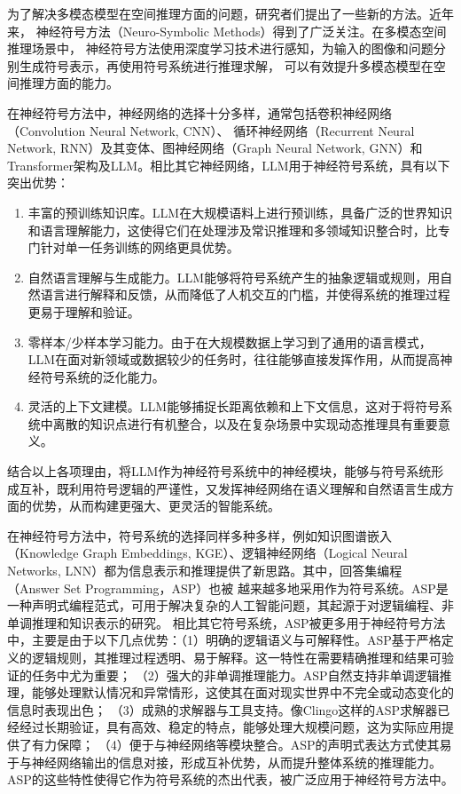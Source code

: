 为了解决多模态模型在空间推理方面的问题，研究者们提出了一些新的方法。近年来，
神经符号方法（Neuro-Symbolic Methods）得到了广泛关注。在多模态空间推理场景中，
神经符号方法使用深度学习技术进行感知，为输入的图像和问题分别生成符号表示，再使用符号系统进行推理求解，
可以有效提升多模态模型在空间推理方面的能力\cite{premsri2025neurosymbolictrainingreasoningspatial}。

在神经符号方法中，神经网络的选择十分多样，通常包括卷积神经网络（Convolution Neural Network, CNN）\cite{mao2019neurosymbolicconceptlearnerinterpreting}、
循环神经网络（Recurrent Neural Network, RNN）\cite{mao2019neurosymbolicconceptlearnerinterpreting}及其变体、图神经网络（Graph Neural Network, GNN）\cite{andreas2017neuralmodulenetworks}和
Transformer架构及LLM。相比其它神经网络，LLM用于神经符号系统，具有以下突出优势：
\begin{enumerate}[nosep]
\item 丰富的预训练知识库。LLM在大规模语料上进行预训练，具备广泛的世界知识和语言理解能力，这使得它们在处理涉及常识推理和多领域知识整合时，比专门针对单一任务训练的网络更具优势\cite{bhargava2022commonsense}。
\item 自然语言理解与生成能力。LLM能够将符号系统产生的抽象逻辑或规则，用自然语言进行解释和反馈，从而降低了人机交互的门槛，并使得系统的推理过程更易于理解和验证\cite{rajani2019explain}。
\item 零样本/少样本学习能力。由于在大规模数据上学习到了通用的语言模式，LLM在面对新领域或数据较少的任务时，往往能够直接发挥作用，从而提高神经符号系统的泛化能力\cite{kojima2022large}。
\item 灵活的上下文建模。LLM能够捕捉长距离依赖和上下文信息，这对于将符号系统中离散的知识点进行有机整合，以及在复杂场景中实现动态推理具有重要意义\cite{wei2022chain}。
\end{enumerate}
结合以上各项理由，将LLM作为神经符号系统中的神经模块，能够与符号系统形成互补，既利用符号逻辑的严谨性，又发挥神经网络在语义理解和自然语言生成方面的优势，从而构建更强大、更灵活的智能系统。

在神经符号方法中，符号系统的选择同样多种多样，例如知识图谱嵌入（Knowledge Graph Embeddings, KGE）、逻辑神经网络（Logical
 Neural Networks, LNN）都为信息表示和推理提供了新思路。其中，回答集编程（Answer Set Programming，ASP）也被
越来越多地采用作为符号系统。ASP是一种声明式编程范式，可用于解决复杂的人工智能问题，其起源于对逻辑编程、非单调推理和知识表示的研究。
相比其它符号系统，ASP被更多用于神经符号方法中，主要是由于以下几点优势：（1）明确的逻辑语义与可解释性。ASP基于严格定义的逻辑规则，其推理过程透明、易于解释。这一特性在需要精确推理和结果可验证的任务中尤为重要\cite{gelfond1988stable}；
（2）强大的非单调推理能力。ASP自然支持非单调逻辑推理，能够处理默认情况和异常情形，这使其在面对现实世界中不完全或动态变化的信息时表现出色\cite{gelfond1988stable}；
（3）成熟的求解器与工具支持。像Clingo这样的ASP求解器已经经过长期验证，具有高效、稳定的特点，能够处理大规模问题，这为实际应用提供了有力保障\cite{gebser2012answer}；
（4）便于与神经网络等模块整合。ASP的声明式表达方式使其易于与神经网络输出的信息对接，形成互补优势，从而提升整体系统的推理能力\cite{garcez2002neural}。
ASP的这些特性使得它作为符号系统的杰出代表，被广泛应用于神经符号方法中\cite{yang2023neuraspembracingneuralnetworks}\cite{cunnington2024neurosymboliclearninganswerset}。

